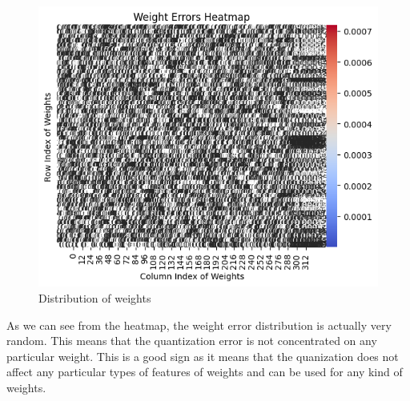 \begin{figure}
	\centering
	\includegraphics[width=\textwidth]{images/weightdist.png}
	\caption{Distribution of weights}
	\label{weightdist}
\end{figure}

As we can see from the heatmap, the weight error distribution is actually very random. This means that the quantization error is not concentrated on any particular weight. This is a good sign as it means that the quanization does not affect any particular types of features of weights and can be used for any kind of weights.